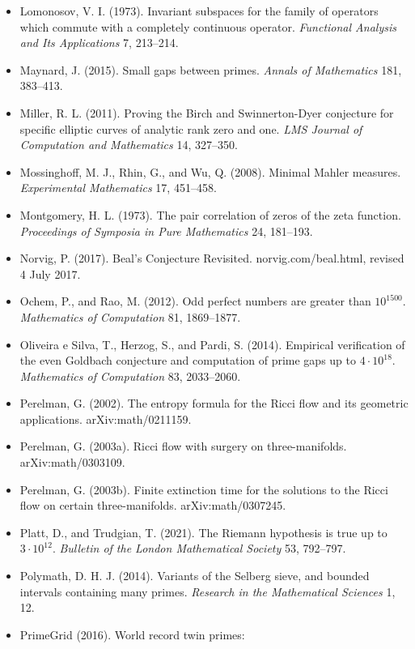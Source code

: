 \documentclass[10pt,twocolumn]{article}
\begin{document}
\begin{itemize}
  \emph{Memoirs of the American Mathematical Society} 166, no. 790.
\item
  Lomonosov, V. I. (1973). Invariant subspaces for the family of
  operators which commute with a completely continuous operator.
  \emph{Functional Analysis and Its Applications} 7, 213--214.
\item
  Maynard, J. (2015). Small gaps between primes. \emph{Annals of
  Mathematics} 181, 383--413.
\item
  Miller, R. L. (2011). Proving the Birch and Swinnerton-Dyer conjecture
  for specific elliptic curves of analytic rank zero and one. \emph{LMS
  Journal of Computation and Mathematics} 14, 327--350.
\item
  Mossinghoff, M. J., Rhin, G., and Wu, Q. (2008). Minimal Mahler
  measures. \emph{Experimental Mathematics} 17, 451--458.
\item
  Montgomery, H. L. (1973). The pair correlation of zeros of the zeta
  function. \emph{Proceedings of Symposia in Pure Mathematics} 24,
  181--193.
\item
  Norvig, P. (2017). Beal's Conjecture Revisited. norvig.com/beal.html,
  revised 4 July 2017.
\item
  Ochem, P., and Rao, M. (2012). Odd perfect numbers are greater than
  \(10^{1500}\). \emph{Mathematics of Computation} 81, 1869--1877.
\item
  Oliveira e Silva, T., Herzog, S., and Pardi, S. (2014). Empirical
  verification of the even Goldbach conjecture and computation of prime
  gaps up to \(4 \cdot 10^{18}\). \emph{Mathematics of Computation} 83,
  2033--2060.
\item
  Perelman, G. (2002). The entropy formula for the Ricci flow and its
  geometric applications. arXiv:math/0211159.
\item
  Perelman, G. (2003a). Ricci flow with surgery on three-manifolds.
  arXiv:math/0303109.
\item
  Perelman, G. (2003b). Finite extinction time for the solutions to the
  Ricci flow on certain three-manifolds. arXiv:math/0307245.
\item
  Platt, D., and Trudgian, T. (2021). The Riemann hypothesis is true up
  to \(3 \cdot 10^{12}\). \emph{Bulletin of the London Mathematical
  Society} 53, 792--797.
\item
  Polymath, D. H. J. (2014). Variants of the Selberg sieve, and bounded
  intervals containing many primes. \emph{Research in the Mathematical
  Sciences} 1, 12.
\item
  PrimeGrid (2016). World record twin primes:

\end{itemize}
\end{document}
